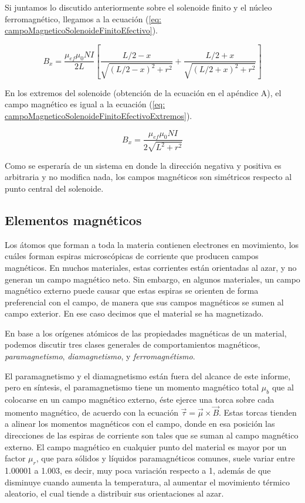 \documentclass[a4paper,12pt]{article}
\begin{document}
        Si juntamos lo discutido anteriormente sobre el solenoide finito y el núcleo ferromagnético, llegamos a la ecuación (\ref{eq: campoMagneticoSolenoideFinitoEfectivo}).

        \begin{equation}
            \label{eq: campoMagneticoSolenoideFinitoEfectivo}
            B_x = \frac{\mu_{ef}\mu_0 N I}{2L} \left[ \frac{L/2 - x}{\sqrt{(L/2 - x)^2 + r^2}} + \frac{L/2 + x}{\sqrt{(L/2 + x)^2 + r^2}} \right]
        \end{equation}

        En los extremos del solenoide (obtención de la ecuación en el apéndice A), el campo magnético es igual a la ecuación (\ref{eq: campoMagneticoSolenoideFinitoEfectivoExtremos}).

        \begin{equation}
            \label{eq: campoMagneticoSolenoideFinitoEfectivoExtremos}
            B_x = \frac{\mu_{ef}\mu_0 N I}{2\sqrt{L^2 + r^2}}
        \end{equation}

        Como se esperaría de un sistema en donde la dirección negativa y positiva es arbitraria y no modifica nada, los campos magnéticos son simétricos respecto al punto central del solenoide.

    \subsection*{Elementos magnéticos}

        Los átomos que forman a toda la materia contienen electrones en movimiento, los cuáles forman espiras microscópicas de corriente que producen campos magnéticos. En muchos materiales, estas corrientes están orientadas al azar, y no generan un campo magnético neto. Sin embargo, en algunos materiales, un campo magnético externo puede causar que estas espiras se orienten de forma preferencial con el campo, de manera que sus campos magnéticos se sumen al campo exterior. En ese caso decimos que el material se ha magnetizado. 

        En base a los orígenes atómicos de las propiedades magnéticas de un material, podemos discutir tres clases generales de comportamientos magnéticos, \emph{paramagnetismo}, \emph{diamagnetismo}, y \emph{ferromagnétismo}. 

        El paramagnetismo y el diamagnetismo están fuera del alcance de este informe, pero en síntesis, el paramagnetismo tiene un momento magnético total $\mu_b$ que al colocarse en un campo magnético externo, éste ejerce una torca sobre cada momento magnético, de acuerdo con la ecuación $\vec{\tau} = \vec{\mu} \times \vec{B}$. Estas torcas tienden a alinear los momentos magnéticos con el campo, donde en esa posición las direcciones de las espiras de corriente son tales que se suman al campo magnético externo. El campo magnético en cualquier punto del material es mayor por un factor $\mu_r$, que para sólidos y líquidos paramagnéticos comunes, suele variar entre 1.00001 a 1.003, es decir, muy poca variación respecto a 1, además de que disminuye cuando aumenta la temperatura, al aumentar el movimiento térmico aleatorio, el cual tiende a distribuir sus orientaciones al azar.
\end{document}
